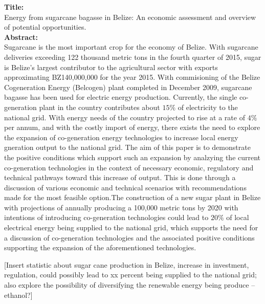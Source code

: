 \documentclass[12pt]{article}
\begin{document}
\noindent
\textbf{Title:} \\

Energy from sugarcane bagasse in Belize: An economic assessment and overview of potential opportunities. \\
\noindent\textbf{Abstract:}\\
Sugarcane is the most important crop for the economy of Belize. With sugarcane deliveries exceeding 122 thousand metric tons in the fourth quarter of 2015, sugar is Belize's largest contributor to the agricultural sector with exports approximating BZ140,000,000 for the year 2015. With commisioning of the Belize Cogeneration Energy (Belcogen) plant completed in December 2009, sugarcane bagasse has been used for electric energy production. Currently, the single co-generation plant in the country contributes about $15\%$ of electricity to the national grid. With energy needs of the country projected to rise at a rate of $4\%$ per annum, and with the costly import of energy, there exists the need to explore the expansion of co-generation energy technologies to increase local energy gneration output to the national grid. The aim of this paper is to demonstrate the positive conditions which support such an expansion by analzying the current co-generation technologies in the context of necessary economic, regulatory and technical pathways toward this increase of output. This is done through a discussion of various economic and technical scenarios with recommendations made for the most feasible option.The construction of a new sugar plant in Belize with projections of annually producing a 100,000 metric tons by 2020 with intentions of introducing co-generation technologies could lead to $20\%$ of local electrical energy being supplied to the national grid, which supports the need for a discussion of co-generation technologies and the associated positive conditions supporting the expansion of the aforementioned technologies.   

[Insert statistic about sugar cane production in Belize, increase in investment, regulation, could possibly lead to xx percent being supplied to the national grid; also explore the possibility of diversifying the renewable energy being produce -- ethanol?]
\end{document}
